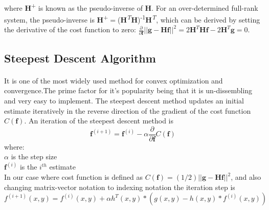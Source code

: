 \documentclass[a4paper]{book}
\newcommand{\pder}[2][]{\frac{\partial#1}{\partial#2}}
\begin{document}
\paragraph*{}where \textbf{H}\textsuperscript{+} is known as the pseudo-inverse of \textbf{H}. For an over-determined full-rank system, the pseudo-inverse is \textbf{H}\textsuperscript{+}$=$(\textbf{H}\textsuperscript{\textit{T}}\textbf{H})\textsuperscript{-1}\textbf{H}\textsuperscript{\textit{T}}, which can be derived by setting the derivative of the cost function to zero: $\frac{\partial}{\partial{\textbf{f}}}||\textbf{g}-\textbf{Hf}||^{2} = 2\textbf{H}^{T}\textbf{Hf}-2\textbf{H}^{T}\textbf{g} = 0$. 
	
\subsection{Steepest Descent Algorithm}
\paragraph*{}It is one of the most widely used method for convex optimization and convergence.The prime factor for it's popularity being that it is un-dissembling and very easy to implement. The steepest descent method updates an initial estimate iteratively in the reverse direction of the gradient of the cost function $ C(\textbf{f}) $. An iteration of the steepest descent method is 
\begin{equation}
\label{eq3.5}
\textbf{f}^{(i+1)}=\textbf{f}^{(i)} - \alpha \pder{\textbf{f}}{C(\textbf{f})} 
\end{equation}
where:\\ $ \alpha $ is the step size \\ $ \textbf{f}^{(i)} $ is the $ i^{th} $ estimate\\

In our case where cost function is defined as $C(\textbf{f})=(1/2)||\textbf{g}-\textbf{Hf}||^{2}$, and also changing matrix-vector notation to indexing notation the iteration step is 
\begin{equation}
\label{eq3.6}
f^{(i+1)}(x,y) = f^{(i)}(x,y) + \alpha h^{T}(x,y)*(g(x,y)-h(x,y)*f^{(i)}(x,y))
\end{equation}
\end{document}
